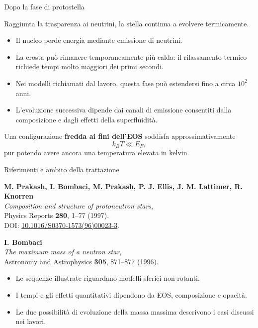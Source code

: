 \begin{frame}[t,label=pns-completa-21]{Dopo la fase di protostella}
\small\raggedright
Raggiunta la trasparenza ai neutrini, la stella continua
a evolvere termicamente.
\begin{itemize}
 \item Il nucleo perde energia mediante emissione di neutrini.
 \item La crosta pu\`o rimanere temporaneamente pi\`u calda:
 il rilassamento termico richiede tempi molto maggiori
 dei primi secondi.
 \item Nei modelli richiamati dal lavoro, questa fase pu\`o
 estendersi fino a circa $10^2$ anni.
 \item L'evoluzione successiva dipende dai canali di emissione
 consentiti dalla composizione e dagli effetti della
 superfluidit\`a.
\end{itemize}
Una configurazione \textbf{fredda ai fini dell'EOS}
soddisfa approssimativamente
\[
 k_B T\ll E_F,
\]
pur potendo avere ancora una temperatura elevata in kelvin.
\end{frame}

\begin{frame}[t,label=pns-completa-22]{Riferimenti e ambito della trattazione}
\small\raggedright
\textbf{M. Prakash, I. Bombaci, M. Prakash, P. J. Ellis,
J. M. Lattimer, R. Knorren}\\
\emph{Composition and structure of protoneutron stars},\\
Physics Reports \textbf{280}, 1--77 (1997).\\
DOI: \href{https://doi.org/10.1016/S0370-1573(96)00023-3}
{10.1016/S0370-1573(96)00023-3}.

\medskip
\textbf{I. Bombaci}\\
\emph{The maximum mass of a neutron star},\\
Astronomy and Astrophysics \textbf{305}, 871--877 (1996).

\medskip
\begin{itemize}
 \item Le sequenze illustrate riguardano modelli
 sferici non rotanti.
 \item I tempi e gli effetti quantitativi dipendono
 da EOS, composizione e opacit\`a.
 \item Le due possibilit\`a di evoluzione della massa massima
 descrivono i casi discussi nei lavori.
\end{itemize}
\end{frame}
